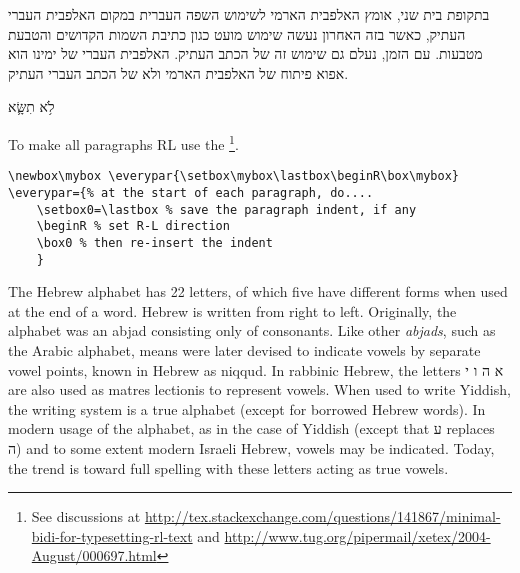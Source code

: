 בתקופת בית שני, אומץ האלפבית הארמי לשימוש השפה העברית במקום האלפבית העברי העתיק, כאשר בזה האחרון נעשה שימוש מועט כגון כתיבת השמות הקדושים והטבעת מטבעות. עם הזמן, נעלם גם שימוש זה של הכתב העתיק. האלפבית העברי של ימינו הוא אפוא פיתוח של האלפבית הארמי ולא של הכתב העברי העתיק.	
{}

 לֹ֥א תִשָּׂ֛א

\endR


\egroup
\bottomline
\medskip

To make all paragraphs  RL use the \cmd{\everypar}\footnote{See discussions at \url{http://tex.stackexchange.com/questions/141867/minimal-bidi-for-typesetting-rl-text} and \url{http://www.tug.org/pipermail/xetex/2004-August/000697.html}}. 

\begin{verbatim}
\newbox\mybox \everypar{\setbox\mybox\lastbox\beginR\box\mybox}
\everypar={% at the start of each paragraph, do....
    \setbox0=\lastbox % save the paragraph indent, if any
    \beginR % set R-L direction
    \box0 % then re-insert the indent
	}
\end{verbatim}

The Hebrew alphabet has 22 letters, of which five have different forms when used at the end of a word. Hebrew is written from right to left. Originally, the alphabet was an abjad consisting only of consonants. Like other \textit{abjads}, such as the Arabic alphabet, means were later devised to indicate vowels by separate vowel points, known in Hebrew as niqqud. In rabbinic Hebrew, the letters א ה ו י are also used as matres lectionis to represent vowels. When used to write Yiddish, the writing system is a true alphabet (except for borrowed Hebrew words). In modern usage of the alphabet, as in the case of Yiddish (except that ע replaces ה) and to some extent modern Israeli Hebrew, vowels may be indicated. Today, the trend is toward full spelling with these letters acting as true vowels.
